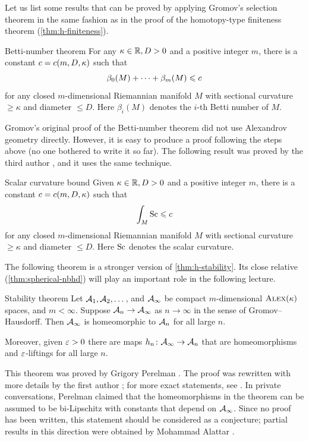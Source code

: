 Let us list some results that can be proved by applying Gromov's selection theorem
in the same fashion as in the proof of the homotopy-type finiteness theorem (\ref{thm:h-finiteness}).

\begin{thm}{Betti-number theorem}\label{thm:betti}
For any $\kappa\in \mathbb{R}, D>0$ and a positive integer $m$,
there is a constant $c=c(m,D,\kappa)$ such that
\[\beta_0(M)+\dots+\beta_m(M)\leqslant c\]
for any closed $m$-dimensional Riemannian manifold $M$ with sectional curvature $\ge \kappa$ and diameter $\le D$.
Here $\beta_i(M)$ denotes the $i$-th Betti number of $M$.
\end{thm}

Gromov's original proof \cite{gromov-1981} of the Betti-number theorem did not use Alexandrov geometry directly.
However, it is easy to produce a proof following the steps above (no one bothered to write it so far).
The following result was proved by the third author \cite{petrunin2008}, and it uses the same technique.

\begin{thm}{Scalar curvature bound}
Given $\kappa\in \mathbb{R}, D>0$ and a positive integer $m$, there is a constant $c=c(m,D,\kappa)$ such that
\[\int_M\mathrm{Sc}\leqslant c\]
for any closed $m$-dimensional Riemannian manifold $M$ with sectional curvature $\ge \kappa$ and diameter $\le D$.
Here $\mathrm{Sc}$ denotes the scalar curvature.
\end{thm}

The following theorem is a stronger version of \ref{thm:h-stability}.
Its close relative (\ref{thm:spherical-nbhd}) will play an important role in the following lecture.

\begin{thm}{Stability theorem}\label{thm:stability}
Let $\mathcal{A}_1,\mathcal{A}_2,\dots$, and $\mathcal{A}_\infty$ be compact $m$-dimensional $\textup{\textsc{Alex}}(\kappa)$ spaces, and $m<\infty$.
Suppose $\mathcal{A}_n\to \mathcal{A}_\infty$ as $n\to \infty$ in the sense of Gromov--Hausdorff.
Then $\mathcal{A}_\infty$ is homeomorphic to $\mathcal{A}_n$ for all large $n$.

Moreover, given $\varepsilon>0$ there are maps $h_n\colon\mathcal{A}_\infty\to \mathcal{A}_n$ that are homeomorphisms and $\varepsilon$-liftings for all large $n$.
\end{thm}

This theorem was proved by Grigory Perelman \cite{perelman1991}.
The proof was rewritten with more details by the first author \cite{kapovitch};
for more exact statements, see \cite{kapovitch2002,kapovitch2005}.
In private conversations, Perelman claimed that the homeomorphisms in the theorem can be assumed to be bi-Lipschitz with constants that depend on $\mathcal{A}_\infty$.
Since no proof has been written, this statement should be considered as a conjecture;
partial results in this direction were obtained by Mohammad Alattar \cite{alattar}.

